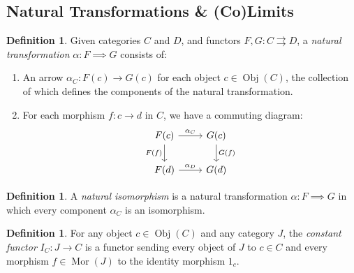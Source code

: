 \documentclass[leqno, openany]{memoir}
\theoremstyle{definition}
\newtheorem{defn}[thm]{Definition}
\theoremstyle{remark}
\theoremstyle{plain}
\theoremstyle{definition}
\theoremstyle{remark}
\DeclareMathOperator{\Obj}{Obj}
\DeclareMathOperator{\Mor}{Mor}
\begin{document}
\newpage
\subsection{Natural Transformations \& (Co)Limits}

\begin{defn}
    Given categories $C$ and $D$, and functors $F,G: C \rightrightarrows D$, a \emph{natural transformation} $\alpha: F \implies G$ consists of:
    \begin{enumerate}
        \item An arrow $\alpha_C: F(c) \to G(c)$ for each object $c \in \Obj(C)$, the collection of which defines the components of the natural transformation.
        \item For each morphism $f: c \to d$ in $C$, we have a commuting diagram:
        \[\begin{tikzcd}
            F(c) \ar[r, "\alpha_C"] \ar[d, "F(f)", swap] & G(c) \ar[d, "G(f)"] \\
            F(d) \ar[r, "\alpha_D"] & G(d)
        \end{tikzcd}\]
    \end{enumerate}
\end{defn}
\begin{defn}
    A \emph{natural isomorphism} is a natural transformation $\alpha: F \implies G$ in which every component $\alpha_C$ is an isomorphism.
\end{defn}


\begin{defn}
    For any object $c \in \Obj(C)$ and any category $J$, the \emph{constant functor} $I_C: J \to C$ is a functor sending every object of $J$ to $c \in C$ and every morphism $f \in \Mor(J)$ to the identity morphism $1_c$.
\end{defn}
\end{document}
